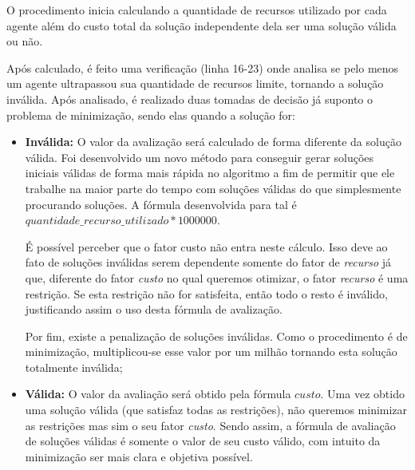 \documentclass[portugues, brazil, a4paper,12pt]{article}
\begin{document}
		O procedimento inicia calculando a quantidade de recursos utilizado por cada agente além do custo total da solução independente dela ser uma solução válida ou não.

		Após calculado, é feito uma verificação (linha 16-23) onde analisa se pelo menos um agente ultrapassou sua quantidade de recursos limite, tornando a solução inválida. Após analisado, é realizado duas tomadas de decisão já suponto o problema de minimização, sendo elas quando a solução for:

		\begin{itemize}
			\item \textbf{Inválida:} O valor da avalização será calculado de forma diferente da solução válida. Foi desenvolvido um novo método para conseguir gerar soluções iniciais válidas de forma mais rápida no algoritmo a fim de permitir que ele trabalhe na maior parte do tempo com soluções válidas do que simplesmente procurando soluções. A fórmula desenvolvida para tal é $quantidade\_recurso\_utilizado * 1000000$. 

			É possível perceber que o fator custo não entra neste cálculo. Isso deve ao fato de soluções inválidas serem dependente somente do fator de \textit{recurso} já que, diferente do fator \textit{custo} no qual queremos otimizar, o fator \textit{recurso} é uma restrição. Se esta restrição não for satisfeita, então todo o resto é inválido, justificando assim o uso desta fórmula de avalização. 

			Por fim, existe a penalização de soluções inválidas. Como o procedimento é de minimização, multiplicou-se esse valor por um milhão tornando esta solução totalmente inválida;


			\item \textbf{Válida:} O valor da avaliação será obtido pela fórmula $custo$. Uma vez obtido uma solução válida (que satisfaz todas as restrições), não queremos minimizar as restrições mas sim o seu fator \textit{custo}. Sendo assim, a fórmula de avaliação de soluções válidas é somente o valor de seu custo válido, com intuito da minimização ser mais clara e objetiva possível.
		\end{itemize}



\end{document}

